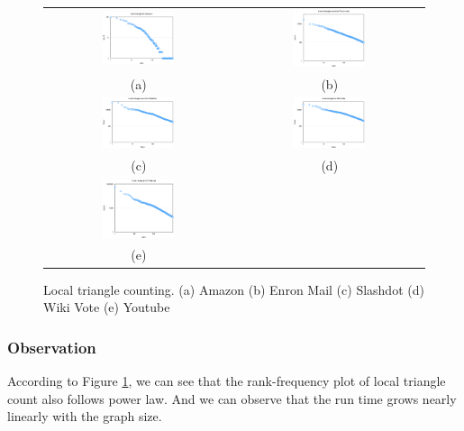 \begin{figure}[!htbf]
\begin{center}
\begin{tabular}{cc}
     \includegraphics[width=0.4\textwidth]{FIG/t7_amazon.png} &
     \includegraphics[width=0.4\textwidth]{FIG/t7_enron.png} \\
     (a) & (b) \\
     \includegraphics[width=0.4\textwidth]{FIG/t7_slashdot.png} &
     \includegraphics[width=0.4\textwidth]{FIG/t7_wikivote.png} \\
     (c) & (d) \\
     \includegraphics[width=0.4\textwidth]{FIG/t7_youtube.png} & \\
     (e)
\end{tabular}
\caption{Local triangle counting. (a) Amazon (b) Enron Mail (c) Slashdot (d) Wiki Vote (e) Youtube}
\label{t7:local}
\end{center}
\end{figure}

\subsubsection{Observation}
According to Figure \ref{t7:local}, we can see that the rank-frequency plot of local triangle count also follows power law. And we can observe that the run time grows nearly linearly with the graph size. 

